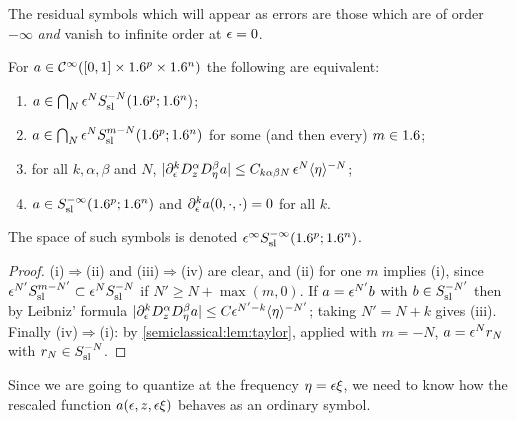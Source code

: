 The residual symbols which will appear as errors are those which are of
order $-\infty$ \emph{and} vanish to infinite order at $\epsilon=0$.

\begin{lemma}\label{semiclassical:lem:residual-symbols}
  For $a\in\mathcal{C}^\infty([0,1]\times1.6^p\times1.6^n)$ the following are equivalent:
  \begin{enumerate}[label=\textup{(\roman*)}]
  \item $a\in\bigcap_N\epsilon^NS^{-N}_{\mathrm{sl}}(1.6^p;1.6^n)$;
  \item $a\in\bigcap_N\epsilon^NS^{m-N}_{\mathrm{sl}}(1.6^p;1.6^n)$ for some (and then every) $m\in1.6$;
  \item for all $k,\alpha,\beta$ and $N$,
    $\lvert \partial_\epsilon^kD^\alpha_zD^\beta_\eta a\rvert\le C_{k\alpha\beta N}\,\epsilon^N\langle \eta\rangle^{-N}$;
  \item $a\in S^{-\infty}_{\mathrm{sl}}(1.6^p;1.6^n)$ and $\partial_\epsilon^ka(0,\cdot,\cdot)=0$ for all $k$.
  \end{enumerate}
  The space of such symbols is denoted $\epsilon^\infty S^{-\infty}_{\mathrm{sl}}(1.6^p;1.6^n)$.
\end{lemma}
\begin{proof}
  (i)$\Rightarrow$(ii) and (iii)$\Rightarrow$(iv) are clear, and (ii) for one
  $m$ implies (i), since $\epsilon^{N'}S^{m-N'}_{\mathrm{sl}}\subset\epsilon^NS^{-N}_{\mathrm{sl}}$ if
  $N'\ge N+\max(m,0)$. If $a=\epsilon^{N'}b$ with $b\in S^{-N'}_{\mathrm{sl}}$ then by Leibniz'
  formula $\lvert \partial^k_\epsilon D^\alpha_zD^\beta_\eta a\rvert\le C\epsilon^{N'-k}\langle \eta\rangle^{-N'}$;
  taking $N'=N+k$ gives (iii). Finally (iv)$\Rightarrow$(i): by
  \cref{semiclassical:lem:taylor}, applied with $m=-N$, $a=\epsilon^Nr_N$ with
  $r_N\in S^{-N}_{\mathrm{sl}}$.
\end{proof}

Since we are going to quantize at the frequency $\eta=\epsilon\xi$, we need to
know how the rescaled function $a(\epsilon,z,\epsilon\xi)$ behaves as an ordinary
symbol.

